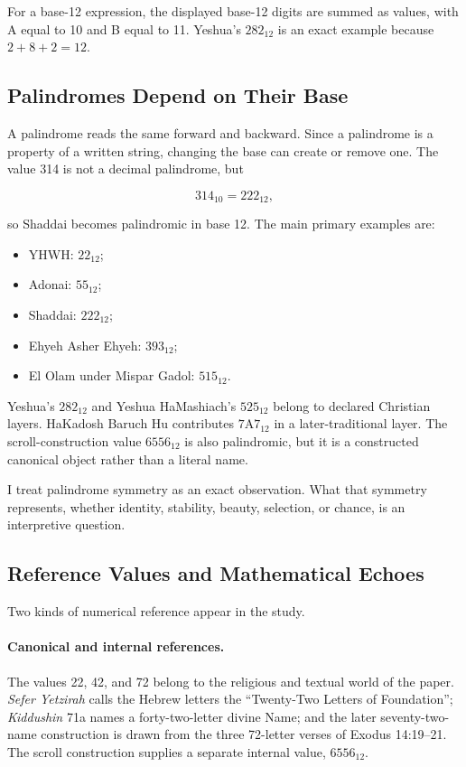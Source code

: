 For a base-12 expression, the displayed base-12 digits are summed as values, with A equal to 10 and B equal to 11. Yeshua's $282_{12}$ is an exact example because $2+8+2=12$.

\subsection{Palindromes Depend on Their Base}

A palindrome reads the same forward and backward. Since a palindrome is a property of a written string, changing the base can create or remove one. The value 314 is not a decimal palindrome, but

\[
314_{10}=222_{12},
\]

so Shaddai becomes palindromic in base 12. The main primary examples are:

\begin{itemize}
\item YHWH: $22_{12}$;
\item Adonai: $55_{12}$;
\item Shaddai: $222_{12}$;
\item Ehyeh Asher Ehyeh: $393_{12}$;
\item El Olam under Mispar Gadol: $515_{12}$.
\end{itemize}

Yeshua's $282_{12}$ and Yeshua HaMashiach's $525_{12}$ belong to declared Christian layers. HaKadosh Baruch Hu contributes $7\mathrm{A}7_{12}$ in a later-traditional layer. The scroll-construction value $6556_{12}$ is also palindromic, but it is a constructed canonical object rather than a literal name.

I treat palindrome symmetry as an exact observation. What that symmetry represents, whether identity, stability, beauty, selection, or chance, is an interpretive question.

\subsection{Reference Values and Mathematical Echoes}

Two kinds of numerical reference appear in the study.

\paragraph{Canonical and internal references.}
The values 22, 42, and 72 belong to the religious and textual world of the paper. \emph{Sefer Yetzirah} calls the Hebrew letters the ``Twenty-Two Letters of Foundation''; \emph{Kiddushin} 71a names a forty-two-letter divine Name; and the later seventy-two-name construction is drawn from the three 72-letter verses of Exodus 14:19--21.\cite{seferyetzirah22,kiddushin42,bahya72} The scroll construction supplies a separate internal value, $6556_{12}$.

